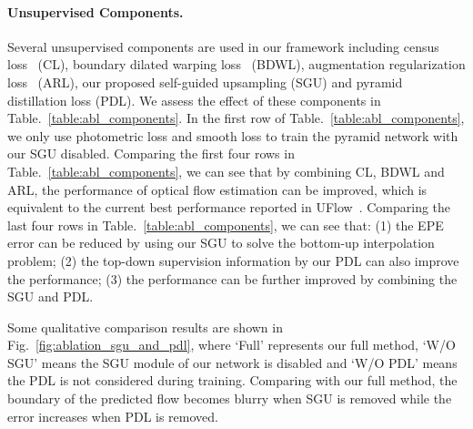 \documentclass[final]{cvpr}
\begin{document}
\paragraph{Unsupervised Components. }
Several unsupervised components are used in our framework including census loss~\cite{unflow_2018aaai} (CL), boundary dilated warping loss~\cite{luo2020occinpflow} (BDWL), augmentation regularization loss~\cite{liu2020learning} (ARL), our proposed self-guided upsampling (SGU) and pyramid distillation loss (PDL). We assess the effect of these components in Table.~\ref{table:abl_components}. 
In the first row of Table.~\ref{table:abl_components}, we only use photometric loss and smooth loss to train the pyramid network with our SGU disabled. 
Comparing the first four rows in Table.~\ref{table:abl_components}, we can see that by combining CL, BDWL and ARL, the performance of optical flow estimation can be improved, which is equivalent to the current best performance reported in UFlow~\cite{jonschkowski2020matters}. Comparing the last four rows in Table.~\ref{table:abl_components}, we can see that: (1) the EPE error can be reduced by using our SGU to solve the bottom-up interpolation problem; (2) the top-down supervision information by our PDL can also improve the performance; (3) the performance can be further improved by combining the SGU and PDL. 

Some qualitative comparison results are shown in Fig.~\ref{fig:ablation_sgu_and_pdl}, where `Full' represents our full method, `W/O SGU' means the SGU module of our network is disabled and `W/O PDL' means the PDL is not considered during training. Comparing with our full method, the boundary of the predicted flow becomes blurry when SGU is removed while the error increases when PDL is removed. 
\vspace{-10pt}
\end{document}
